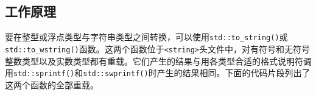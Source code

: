 
\subsection{工作原理}



要在整型或浮点类型与字符串类型之间转换，可以使用\texttt{std::\allowbreak{}to\_\allowbreak{}string()}或\texttt{std::\allowbreak{}to\_\allowbreak{}wstring()}函数。这两个函数位于\texttt{<\allowbreak{}string>}头文件中，对有符号和无符号整数类型以及实数类型都有重载。它们产生的结果与用各类型合适的格式说明符调用\texttt{std::\allowbreak{}sprintf()}和\texttt{std::\allowbreak{}swprintf()}时产生的结果相同。下面的代码片段列出了这两个函数的全部重载。



